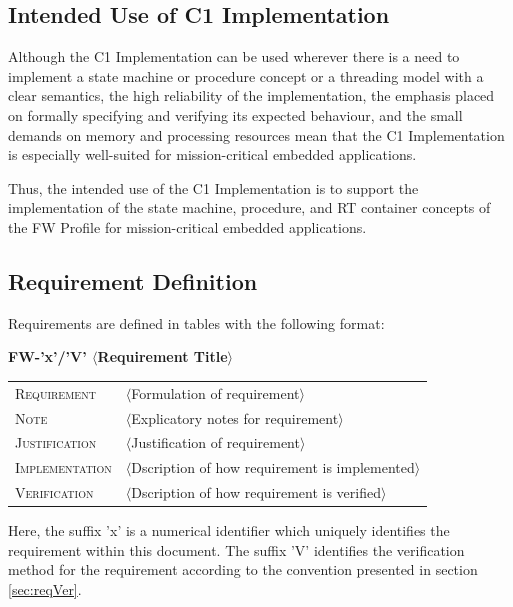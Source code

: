 \documentclass[a4paper,10pt]{article}
\begin{document}
\subsection{Intended Use of C1 Implementation}\label{sec:intendedUse}
Although the C1 Implementation can be used wherever there is a need to implement a state machine or procedure concept or a threading model with a clear semantics, the high reliability of the implementation, the emphasis placed on formally specifying and verifying its expected behaviour, and the small demands on memory and processing resources mean that the C1 Implementation is especially well-suited for mission-critical embedded applications. 

Thus, the intended use of the C1 Implementation is to support the implementation of the state machine, procedure, and RT container concepts of the FW Profile for mission-critical embedded applications.

\subsection{Requirement Definition}\label{sec:reqDef}
Requirements are defined in tables with the following format:

\hspace{0.2cm}\textbf{FW-'x'/'V' \hspace{0.9cm} $\langle$Requirement Title$\rangle$}
\vspace{-10pt}

\begin{longtable}{p{2.7cm}P{8.5cm}}
\hline
\textsc{Requirement} & $\langle$Formulation of requirement$\rangle$ \\
\textsc{Note} & $\langle$Explicatory notes for requirement$\rangle$ \\
\textsc{Justification} & $\langle$Justification of requirement$\rangle$ \\
\textsc{Implementation} & $\langle$Dscription of how requirement is implemented$\rangle$ \\ 
\textsc{Verification} & $\langle$Dscription of how requirement is verified$\rangle$ \\
\hline
\end{longtable}

Here, the suffix 'x' is a numerical identifier which uniquely identifies the requirement
within this document. The suffix 'V' identifies the verification method for the requirement according to the convention presented in section \ref{sec:reqVer}.
\end{document}
